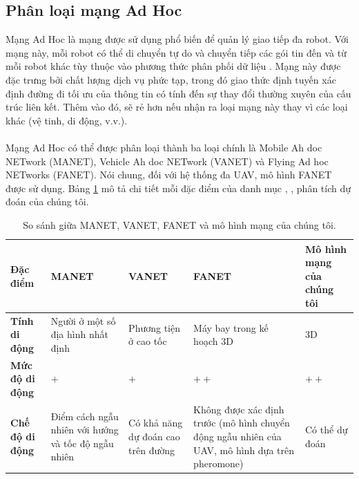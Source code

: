 \documentclass[11pt,openany]{book}
\begin{document}
\begin{algorimth}[H]
\subsection{Phân loại mạng Ad Hoc}
Mạng Ad Hoc là mạng được sử dụng phổ biến để quản lý giao tiếp đa robot. Với mạng này, mỗi robot có thể di chuyển tự do và chuyển tiếp các gói tin đến và từ mỗi robot khác tùy thuộc vào phương thức phân phối dữ liệu \cite{bouachir2014conception}. Mạng này được đặc trưng bởi chất lượng dịch vụ phức tạp, trong đó giao thức định tuyến xác định đường đi tối ưu của thông tin có tính đến sự thay đổi thường xuyên của cấu trúc liên kết. Thêm vào đó, sẽ rẻ hơn nếu nhận ra loại mạng này thay vì các loại khác (vệ tinh, di động, v.v.).\\\\
Mạng Ad Hoc có thể được phân loại thành ba loại chính là Mobile Ah doc NETwork (MANET), Vehicle Ah doc NETwork (VANET) và Flying Ad hoc NETworks (FANET). Nói chung, đối với hệ thống đa UAV, mô hình FANET được sử dụng. Bảng \ref{tab:4.2} mô tả chi tiết mỗi đặc điểm của danh mục \cite{bekmezci2013flying}, \cite{maistrenko2016experimental}, phân tích dự đoán của chúng tôi.
\begin{table}[H]
    \centering
    \caption{So sánh giữa MANET, VANET, FANET và mô hình mạng của chúng tôi.}
    \label{tab:4.2}
    \begin{tabular}{|p{2.8cm}|p{1.5cm}|p{1.5cm}|p{1.8cm}|p{1.8cm}|}\hline
        \textbf{Đặc điểm}                                                 & \textbf{MANET}                                      & \textbf{VANET}                       & \textbf{FANET}                                                                                 & \textbf{Mô hình mạng của chúng tôi}
        \\\hline
        \textbf{Tính di động}                                             & Người ở một số địa hình nhất định                   & Phương tiện ở cao tốc                & Máy bay trong kế hoạch 3D                                                                      & 3D                                  \\\hline
        \textbf{Mức độ di động}                                           & $+$                                                 & $+$                                  & $++$                                                                                           & $++$                                \\\hline
        \textbf{Chế độ di động}                                           & Điểm cách ngẫu nhiên với hướng và tốc độ ngẫu nhiên & Có khả năng dự đoán cao trên đường   & Không được xác định trước (mô hình chuyển động ngẫu nhiên của UAV, mô hình dựa trên pheromone) & Có thể dự đoán                      \\\hline

\end{tabular}
\end{table}
\end{algorimth}
\end{document}

